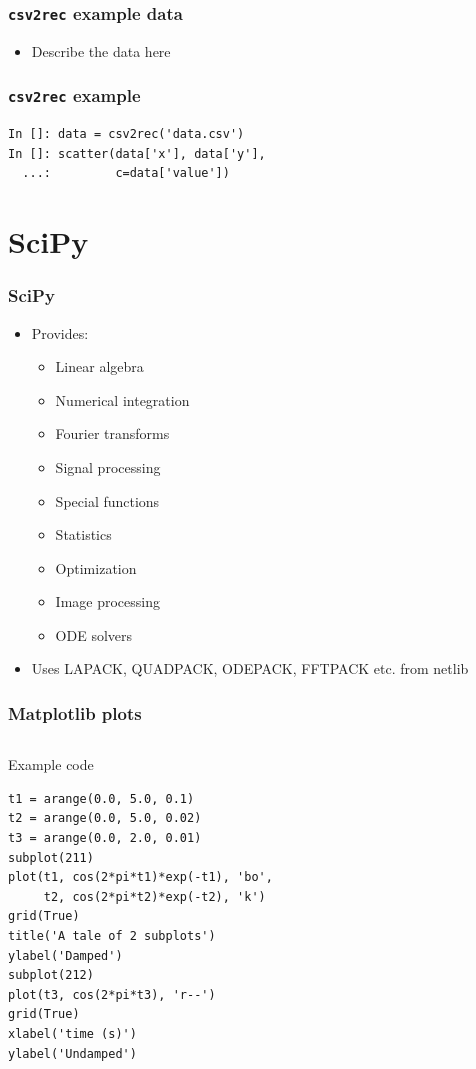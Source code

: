 \documentclass[14pt,compress]{beamer}
\newcounter{time}
\newcommand{\typ}[1]{\lstinline{#1}}
\begin{document}
\begin{frame}[fragile]
    \frametitle{\typ{csv2rec} example data}
    \begin{itemize}
        \item Describe the data here
    \end{itemize}
\end{frame}

\begin{frame}[fragile]
    \frametitle{\typ{csv2rec} example}
    \begin{lstlisting}
In []: data = csv2rec('data.csv')
In []: scatter(data['x'], data['y'], 
  ...:         c=data['value'])
    \end{lstlisting}
\end{frame}


\section{SciPy}
\begin{frame}[plain]
  \frametitle{SciPy}
  \begin{itemize}
  \item Provides:
    \begin{itemize}
    \item Linear algebra
    \item Numerical integration
    \item Fourier transforms
    \item Signal processing
    \item Special functions
    \item Statistics
    \item Optimization
    \item Image processing
    \item ODE solvers
    \end{itemize}
  \item Uses LAPACK, QUADPACK, ODEPACK, FFTPACK etc. from netlib
  \end{itemize}
\end{frame}



\begin{frame}
  \frametitle{Matplotlib plots}
  \begin{columns}
    \hspace*{-0.5in}
    \begin{block}{Example code}
    \tiny
\begin{lstlisting}
t1 = arange(0.0, 5.0, 0.1)
t2 = arange(0.0, 5.0, 0.02)
t3 = arange(0.0, 2.0, 0.01)
subplot(211)
plot(t1, cos(2*pi*t1)*exp(-t1), 'bo', 
     t2, cos(2*pi*t2)*exp(-t2), 'k')
grid(True)
title('A tale of 2 subplots')
ylabel('Damped')
subplot(212)
plot(t3, cos(2*pi*t3), 'r--')
grid(True)
xlabel('time (s)')
ylabel('Undamped')
\end{lstlisting}
    \end{block}
  \end{columns}
\end{frame}
\end{document}
